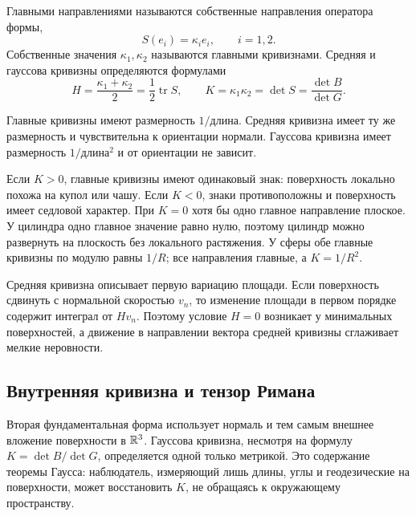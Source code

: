 \begin{definition}
Главными направлениями называются собственные направления оператора формы,
\[
S(e_i)=\kappa_i e_i,
\qquad i=1,2.
\]
Собственные значения \(\kappa_1,\kappa_2\) называются главными кривизнами. Средняя и гауссова кривизны определяются формулами
\begin{equation}
\label{eq:mean-gaussian-curvature}
H=\frac{\kappa_1+\kappa_2}{2}
=\frac12\operatorname{tr}S,
\qquad
K=\kappa_1\kappa_2
=\det S
=\frac{\det B}{\det G}.
\end{equation}
\end{definition}

Главные кривизны имеют размерность \(1/\text{длина}\). Средняя кривизна имеет ту же размерность и чувствительна к ориентации нормали. Гауссова кривизна имеет размерность \(1/\text{длина}^2\) и от ориентации не зависит.

Если \(K>0\), главные кривизны имеют одинаковый знак: поверхность локально похожа на купол или чашу. Если \(K<0\), знаки противоположны и поверхность имеет седловой характер. При \(K=0\) хотя бы одно главное направление плоское. У цилиндра одно главное значение равно нулю, поэтому цилиндр можно развернуть на плоскость без локального растяжения. У сферы обе главные кривизны по модулю равны \(1/R\); все направления главные, а \(K=1/R^2\).

Средняя кривизна описывает первую вариацию площади. Если поверхность сдвинуть с нормальной скоростью \(v_n\), то изменение площади в первом порядке содержит интеграл от \(H v_n\). Поэтому условие \(H=0\) возникает у минимальных поверхностей, а движение в направлении вектора средней кривизны сглаживает мелкие неровности.

\subsection{Внутренняя кривизна и тензор Римана}

Вторая фундаментальная форма использует нормаль и тем самым внешнее вложение поверхности в \(\mathbb{R}^3\). Гауссова кривизна, несмотря на формулу \(K=\det B/\det G\), определяется одной только метрикой. Это содержание теоремы Гаусса: наблюдатель, измеряющий лишь длины, углы и геодезические на поверхности, может восстановить \(K\), не обращаясь к окружающему пространству.

